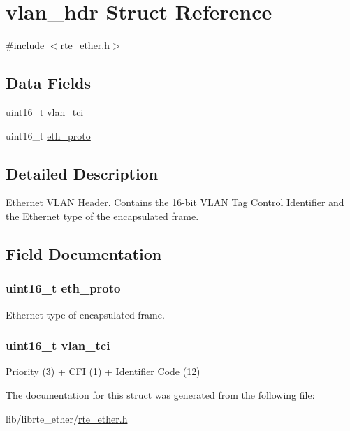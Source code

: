 \hypertarget{structvlan__hdr}{}\section{vlan\+\_\+hdr Struct Reference}
\label{structvlan__hdr}


{\ttfamily \#include $<$rte\+\_\+ether.\+h$>$}

\subsection*{Data Fields}
\begin{DoxyCompactItemize}
\item 
uint16\+\_\+t \hyperlink{structvlan__hdr_a466610c1a1f26aace575dc4dc60d81b3}{vlan\+\_\+tci}
\item 
uint16\+\_\+t \hyperlink{structvlan__hdr_a5f6e76ca3fcc9927ee0ff351b452b89b}{eth\+\_\+proto}
\end{DoxyCompactItemize}


\subsection{Detailed Description}
Ethernet V\+L\+A\+N Header. Contains the 16-\/bit V\+L\+A\+N Tag Control Identifier and the Ethernet type of the encapsulated frame. 

\subsection{Field Documentation}
\hypertarget{structvlan__hdr_a5f6e76ca3fcc9927ee0ff351b452b89b}{}
\subsubsection[{eth\+\_\+proto}]{\setlength{\rightskip}{0pt plus 5cm}uint16\+\_\+t eth\+\_\+proto}\label{structvlan__hdr_a5f6e76ca3fcc9927ee0ff351b452b89b}
Ethernet type of encapsulated frame. \hypertarget{structvlan__hdr_a466610c1a1f26aace575dc4dc60d81b3}{}
\subsubsection[{vlan\+\_\+tci}]{\setlength{\rightskip}{0pt plus 5cm}uint16\+\_\+t vlan\+\_\+tci}\label{structvlan__hdr_a466610c1a1f26aace575dc4dc60d81b3}
Priority (3) + C\+F\+I (1) + Identifier Code (12) 

The documentation for this struct was generated from the following file\+:\begin{DoxyCompactItemize}
\item 
lib/librte\+\_\+ether/\hyperlink{rte__ether_8h}{rte\+\_\+ether.\+h}\end{DoxyCompactItemize}
